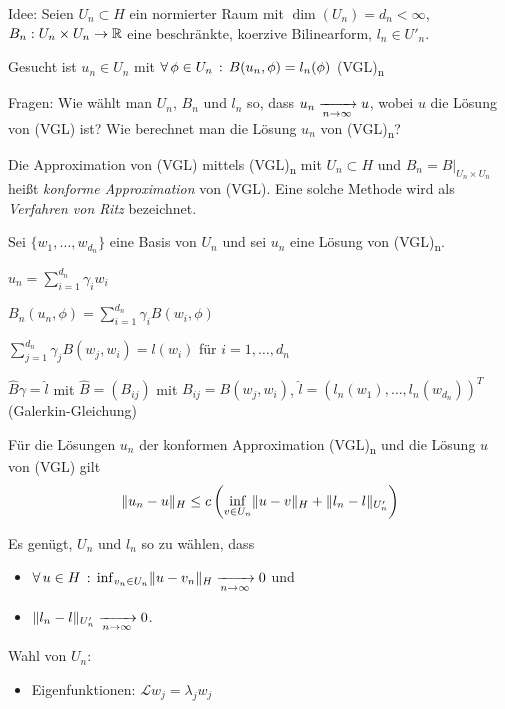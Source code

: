 \documentclass{cheat-sheet}
\newcommand{\LL}{\mathcal{L}} %
\newcommand{\tss}[1]{\textsubscript{#1}} %
\begin{document}
Idee: Seien $U_n \subset H$ ein normierter Raum mit $\dim(U_n) = d_n < \infty$, $B_n : U_n \times U_n \to \mathbb{R}$ eine beschränkte, koerzive Bilinearform, $l_n \in U'_n.$

Gesucht ist $u_n \in U_n$ mit $\forall \, {\phi \in U_n} \,:\, B(u_n, \phi) = l_n(\phi)$ (VGL)\tss{n}

Fragen: Wie wählt man $U_n$, $B_n$ und $l_n$ so, dass $u_n \xrightarrow[n \to \infty]{} u$, wobei $u$ die Lösung von (VGL) ist?
Wie berechnet man die Lösung $u_n$ von (VGL)\tss{n}?

\begin{defn}
  Die Approximation von (VGL) mittels (VGL)\tss{n} mit $U_n \subset H$ und $B_n = B|_{U_n \times U_n}$ heißt \emph{konforme Approximation} von (VGL).
  Eine solche Methode wird als \emph{Verfahren von Ritz} bezeichnet.
\end{defn}

Sei $\{ w_1, \ldots, w_{d_n} \}$ eine Basis von $U_n$ und sei $u_n$ eine Lösung von (VGL)\tss{n}.

$u_n = \sum_{i=1}^{d_n} \gamma_i w_i$

$B_n(u_n, \phi) = \sum_{i=1}^{d_n} \gamma_i B(w_i, \phi)$

$\sum_{j=1}^{d_n} \gamma_j B(w_j, w_i) = l(w_i)$ für $i = 1, \ldots, d_n$

$\hat{B} \gamma = \hat{l}$ mit $\hat{B} = (B_{ij})$ mit $B_{ij} = B(w_j, w_i)$, $\hat{l} = (l_n(w_1), \ldots, l_n(w_{d_n}))^T$ (Galerkin-Gleichung)

\begin{satz}
  Für die Lösungen $u_n$ der konformen Approximation (VGL)\tss{n} und die Lösung $u$ von (VGL) gilt
  \[ \lVert u_n - u\rVert_H \leq c \left( \inf_{v \in U_n} \lVert u - v\rVert_H + \lVert l_n - l\rVert_{U_n'} \right) \]
\end{satz}

\begin{folgerung}
  Es genügt, $U_n$ und $l_n$ so zu wählen, dass
  \begin{itemize}
    \item $\forall \, {u \in H} \,:\, \inf_{v_n \in U_n} \lVert u - v_n\rVert_H \xrightarrow[n \to \infty]{} 0$ und
    \item $\lVert l_n - l\rVert_{U'_n} \xrightarrow[n \to \infty]{} 0$.
  \end{itemize}
\end{folgerung}

Wahl von $U_n$:
\begin{itemize}
  \item Eigenfunktionen: $\LL w_j = \lambda_j w_j$
\end{itemize}
\end{document}
